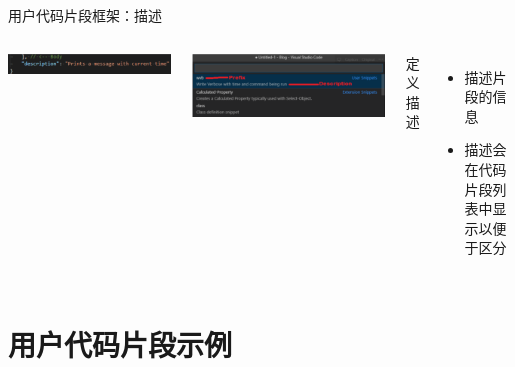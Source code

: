 \documentclass{beamer}
\begin{document}
\begin{frame}{用户代码片段框架：描述}
    \begin{columns}
        \begin{minipage}[c][.2\textheight][c]{\linewidth}
            \centering
            \includegraphics[scale=0.22]{pic/description.png}
        \end{minipage}
        \begin{minipage}[c][.35\textheight][c]{\linewidth}
            \centering
            \includegraphics[scale=0.12]{pic/descritpin2.png}
        \end{minipage}
        定义描述
        \begin{itemize}
            \item 描述片段的信息
            \item 描述会在代码片段列表中显示以便于区分
        \end{itemize}
    \end{columns}
\end{frame}

\section{用户代码片段示例}
\end{document}

